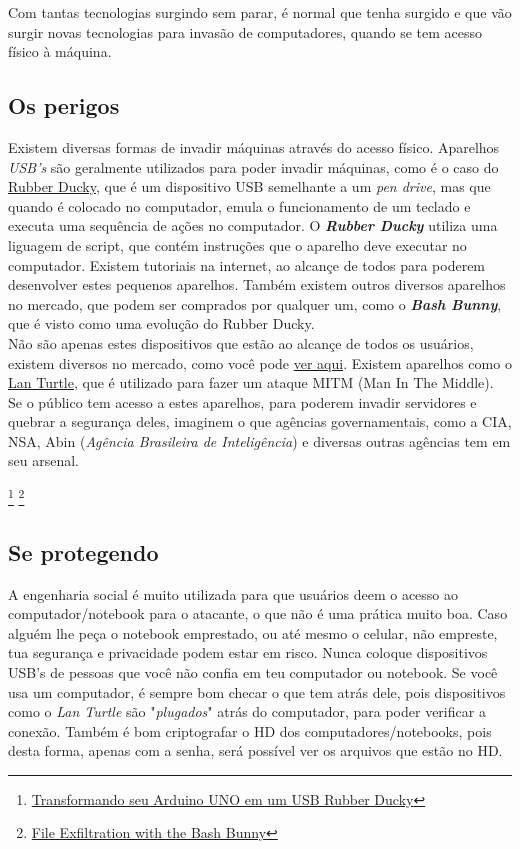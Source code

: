 \documentclass[12pt, letterpaper, Monospace:12]{report}
\begin{document}
	Com tantas tecnologias surgindo sem parar, é normal que tenha surgido e que vão surgir novas tecnologias para invasão de computadores, quando se tem acesso físico à máquina.
	\subsection{Os perigos}
	Existem diversas formas de invadir máquinas através do acesso físico. Aparelhos \textit{USB's} são geralmente utilizados para poder invadir máquinas, como é o caso do \href{https://pt.wikipedia.org/wiki/Rubber_Ducky}{Rubber Ducky}, que é um dispositivo USB semelhante a um \textit{pen drive}, mas que quando é colocado no computador, emula o funcionamento de um teclado e executa uma sequência de ações no computador. O \textit{\textbf{Rubber Ducky}} utiliza uma liguagem de script, que contém instruções que o aparelho deve executar no computador. Existem tutoriais na internet, ao alcançe de todos para poderem desenvolver estes pequenos aparelhos. Também existem outros diversos aparelhos no mercado, que podem ser comprados por qualquer um, como o \textit{\textbf{Bash Bunny}}, que é visto como uma evolução do Rubber Ducky.\\

	Não são apenas estes dispositivos que estão ao alcançe de todos os usuários, existem diversos no mercado, como você pode \href{https://hakshop.com/}{ver aqui}. Existem aparelhos como o \href{https://hakshop.com/products/lan-turtle}{Lan Turtle}, que é utilizado para fazer um ataque MITM (Man In The Middle).\\

	Se o público tem acesso a estes aparelhos, para poderem invadir servidores e quebrar a segurança deles, imaginem o que agências governamentais, como a CIA, NSA, Abin (\textit{Agência Brasileira de Inteligência}) e diversas outras agências tem em seu arsenal.

\footnote{\href{http://pythoneiro.blogspot.com.br/2015/04/transformando-seu-arduino-uno-em-um-usb.html?ref=@pr1v8}{Transformando seu Arduino UNO em um USB Rubber Ducky}}
\footnote{\href{http://brianlam.me/blog/file-exfiltration-with-the-bash-bunny}{File Exfiltration with the Bash Bunny}}
\pagebreak

	\subsection{Se protegendo}
		A engenharia social é muito utilizada para que usuários deem o acesso ao computador/notebook para o atacante, o que não é uma prática muito boa. Caso alguém lhe peça o notebook emprestado, ou até mesmo o celular, não empreste, tua segurança e privacidade podem estar em risco. Nunca coloque dispositivos USB's de pessoas que você não confia em teu computador ou notebook. Se você usa um computador, é sempre bom checar o que tem atrás dele, pois dispositivos como o \textit{Lan Turtle} são "\textit{plugados}" atrás do computador, para poder verificar a conexão. Também é bom criptografar o HD dos computadores/notebooks, pois desta forma, apenas com a senha, será possível ver os arquivos que estão no HD.\\
\end{document}
